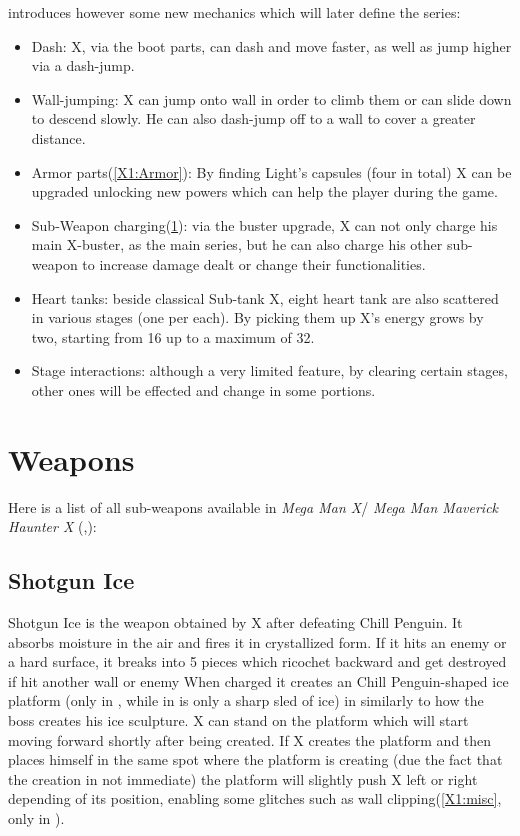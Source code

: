 \x introduces however some new mechanics which will later define the series\cite{wiki:X1_features}:
\begin{itemize}
	\item Dash: X, via the boot parts, can dash and move faster, as well as jump higher via a dash-jump.
	\item Wall-jumping: X can jump onto wall in order to climb them or can slide down to descend slowly. He can also dash-jump off to a wall to cover a greater distance.
	\item Armor parts(\ref{X1:Armor}): By finding Light's capsules (four in total) X can be upgraded unlocking new powers which can help the player during the game.
	\item Sub-Weapon charging(\ref{X1:sub_weapon}): via the buster upgrade, X can not only charge his main X-buster, as the main series, but he can also charge his other sub-weapon to increase damage dealt or change their functionalities.
	\item Heart tanks: beside classical Sub-tank X, eight heart tank are also scattered in various stages (one per each). By picking them up X's energy grows by two, starting from 16 up to a maximum of 32\cite{stratwiki:Heart_tank}.
	\item Stage interactions: although a very limited feature, by clearing certain stages, other ones will be effected and change in some portions.
\end{itemize}

\section{Weapons}\label{X1:sub_weapon}
Here is a list of all sub-weapons available in\textit{ Mega Man X}/ \textit{Mega Man Maverick Haunter X} (\cite{MHX:manual},\cite{wiki:X_weapons}):

\subsection{Shotgun Ice}\label{Shotgun_ice}
Shotgun Ice is the weapon obtained by X after defeating Chill Penguin. It absorbs moisture in the air and fires it in crystallized form. If it hits an enemy or a hard surface, it breaks into 5 pieces which ricochet backward and get destroyed if hit another wall or enemy When charged it creates an Chill Penguin-shaped ice platform (only in \x, while in \mhx is only a sharp sled of ice) in similarly to how the boss creates his ice sculpture. X can stand on the platform which will start moving forward shortly after being created. If X creates the platform and then places himself in the same spot where the platform is creating (due the fact that the creation in not immediate) the platform will slightly push X left or right depending of its position, enabling some glitches such as wall clipping(\ref{X1:misc}, only in \x).


